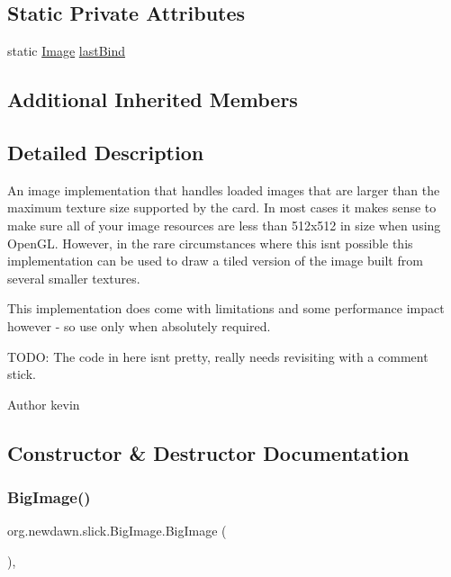 \subsection*{Static Private Attributes}
\begin{DoxyCompactItemize}
\item 
static \mbox{\hyperlink{classorg_1_1newdawn_1_1slick_1_1_image}{Image}} \mbox{\hyperlink{classorg_1_1newdawn_1_1slick_1_1_big_image_af04b73bd7ffe77e4b86def5a4d1f9152}{last\+Bind}}
\end{DoxyCompactItemize}
\subsection*{Additional Inherited Members}


\subsection{Detailed Description}
An image implementation that handles loaded images that are larger than the maximum texture size supported by the card. In most cases it makes sense to make sure all of your image resources are less than 512x512 in size when using Open\+GL. However, in the rare circumstances where this isn\textquotesingle{}t possible this implementation can be used to draw a tiled version of the image built from several smaller textures.

This implementation does come with limitations and some performance impact however -\/ so use only when absolutely required.

T\+O\+DO\+: The code in here isn\textquotesingle{}t pretty, really needs revisiting with a comment stick.

\begin{DoxyAuthor}{Author}
kevin 
\end{DoxyAuthor}


\subsection{Constructor \& Destructor Documentation}
\mbox{\label{classorg_1_1newdawn_1_1slick_1_1_big_image_a729b8a17ca390d0ad9fa715269b17009}} 
\subsubsection{\texorpdfstring{Big\+Image()}{BigImage()}\hspace{0.1cm}{\footnotesize\ttfamily [1/6]}}
{\footnotesize\ttfamily org.\+newdawn.\+slick.\+Big\+Image.\+Big\+Image (\begin{DoxyParamCaption}{ }\end{DoxyParamCaption})\hspace{0.3cm}{\ttfamily [inline]}, {\ttfamily [private]}}

